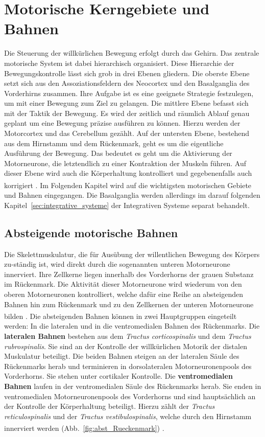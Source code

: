 \documentclass[12pt,a4paper,pdftex]{article}
\begin{document}
\newpage
\section{Motorische Kerngebiete und Bahnen}  \label{sec:Motorik}
Die Steuerung der willkürlichen Bewegung erfolgt durch das Gehirn. Das zentrale motorische System ist dabei hierarchisch organisiert. Diese Hierarchie der Bewegungskontrolle lässt sich grob in drei Ebenen gliedern. Die oberste Ebene setzt sich aus den Assoziationsfeldern des Neocortex und den Basalganglia des Vorderhirns zusammen. Ihre Aufgabe ist es eine geeignete Strategie festzulegen, um mit einer Bewegung zum Ziel zu gelangen. Die mittlere Ebene befasst sich mit der Taktik der Bewegung. Es wird der zeitlich und räumlich Ablauf genau geplant um eine Bewegung präzise ausführen zu können. Hierzu werden der Motorcortex und das Cerebellum gezählt. Auf der untersten Ebene, bestehend aus dem Hirnstamm und dem Rückenmark, geht es um die eigentliche Ausführung der Bewegung. Das bedeutet es geht um die Aktivierung der Motorneurone, die letztendlich zu einer Kontraktion der Muskeln führen. Auf dieser Ebene wird auch die Körperhaltung kontrolliert und gegebenenfalls auch korrigiert \textsuperscript{\cite[14]{neurowissenschaften_baer}}. Im Folgenden Kapitel wird auf die wichtigsten motorischen Gebiete und Bahnen eingegangen. Die Basalganglia werden allerdings im darauf folgenden Kapitel~\ref{sec:integrative_systeme} der Integrativen Systeme separat behandelt.       

\subsection{Absteigende motorische Bahnen}
Die Skelettmuskulatur, die für Ausübung der willentlichen Bewegung des Körpers zu-ständig ist, wird direkt durch die sogenannten unteren Motorneurone innerviert. Ihre Zellkerne liegen innerhalb des Vorderhorns der grauen Substanz im Rückenmark. Die Aktivität dieser Motorneurone wird wiederum von den oberen Motorneuronen kontrolliert, welche dafür eine Reihe an absteigenden Bahnen hin zum Rückenmark und zu den Zellkernen der unteren Motorneurone bilden \textsuperscript{\cite[1]{crossman2014neuroanatomy}}. Die absteigenden Bahnen können in zwei Hauptgruppen eingeteilt werden: In die lateralen und in die ventromedialen Bahnen des Rückenmarks. Die \textbf{lateralen Bahnen} bestehen aus dem \textit{Tractus corticospinalis} und dem \textit{Tractus rubrospinalis}. Sie sind an der Kontrolle der willkürlichen Motorik der distalen Muskulatur beteiligt. Die beiden Bahnen steigen an der lateralen Säule des Rückenmarks herab und terminieren in dorsolateralen Motorneuronenpools des Vorderhorns. Sie stehen unter cortikaler Kontrolle. Die \textbf{ventromedialen Bahnen} laufen in der ventromedialen Säule des Rückenmarks herab. Sie enden in ventromedialen Motorneuronenpools des Vorderhorns und sind hauptsächlich an der Kontrolle der Körperhaltung beteiligt. Hierzu zählt der \textit{Tractus reticulospinalis} und der \textit{Tractus vestibulospinalis}, welche durch den Hirnstamm innerviert werden (Abb.~\ref{fig:abst_Rueckenmark}) \textsuperscript{\cite[14]{neurowissenschaften_baer}}. 
\end{document}
